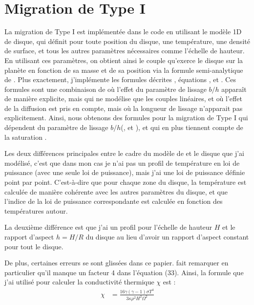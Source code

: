 \section{Migration de Type I}
La migration de Type I est implémentée dans le code en utilisant le modèle 1D de disque, qui définit pour toute position du 
disque, une température, une densité de surface, et tous les autres paramètres nécessaires comme l'échelle de hauteur. En 
utilisant ces paramètres, on obtient ainsi le couple qu'exerce le disque sur la planète en fonction de sa masse et de sa 
position via la formule semi-analytique de \cite{paardekooper2011torque}. Plus exactement, j'implémente les formules décrites 
, équations ,  et 
. Ces formules sont une combinaison de \cite{paardekooper2010torque} où l'effet du paramètre 
de lissage $b/h$ apparaît de manière explicite, mais qui ne modélise que les couples linéaires, et \cite{paardekooper2011torque} 
où l'effet de la diffusion est pris en compte, mais où la longueur de lissage n'apparait pas explicitement. Ainsi, nous 
obtenons des formules pour la migration de Type I qui dépendent du paramètre de lissage $b/h$(, 
 et 
), et qui en plus tiennent compte 
de la saturation \citep[eqs. (50) à (53)]{paardekooper2011torque}.

Les deux différences principales entre le cadre du modèle de \cite{paardekooper2011torque} et le disque que j'ai modélisé, c'est que dans mon cas je n'ai pas un profil de température en loi de puissance (avec une seule loi de puissance), mais j'ai une loi de puissance définie point par point. C'est-à-dire que pour chaque zone du disque, la température est calculée de manière cohérente avec les autres paramètres du disque, et que l'indice de la loi de puissance correspondante est calculée en fonction des températures autour.

La deuxième différence est que j'ai un profil pour l'échelle de hauteur $H$ et le rapport d'aspect $h=H/R$ du disque au lieu d'avoir un rapport d'aspect constant pour tout le disque.

\bigskip

De plus, certaines erreurs se sont glissées dans ce papier. \cite[appendice A]{bitsch2011range} fait remarquer en particulier qu'il manque un facteur 4 dans l'équation (33). Ainsi, la formule que j'ai utilisé pour calculer la conductivité thermique $\chi$ est :
\begin{align}
\chi &= \frac{16\gamma (\gamma-1) \sigma T^4}{3\kappa \rho^2 H^2\Omega^2}
\end{align}

